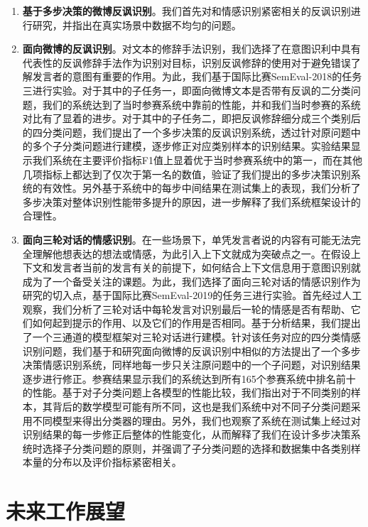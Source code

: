 \begin{enumerate}

\item {\bf 基于多步决策的微博反讽识别}。我们首先对和情感识别紧密相关的反讽识别进行研究，并指出在真实场景中数据不均匀的问题。



\item {\bf 面向微博的反讽识别}。对文本的修辞手法识别，我们选择了在意图识利中具有代表性的反讽修辞手法作为识别对目标，识别反讽修辞的使用对于避免错误了解发言者的意图有重要的作用。为此，我们基于国际比赛SemEval-2018的任务三进行实验。对于其中的子任务一，即面向微博文本是否带有反讽的二分类问题，我们的系统达到了当时参赛系统中靠前的性能，并和我们当时参赛的系统对比有了显着的进步。对于其中的子任务二，即把反讽修辞细分成三个类别后的四分类问题，我们提出了一个多步决策的反讽识别系统，透过针对原问题中的多个子分类问题进行建模，逐步修正对应类别样本的识别结果。实验结果显示我们系统在主要评价指标F1值上显着优于当时参赛系统中的第一，而在其他几项指标上都达到了仅次于第一名的数值，验证了我们提出的多步决策识别系统的有效性。另外基于系统中的每步中间结果在测试集上的表现，我们分析了多步决策对整体识别性能带多提升的原因，进一步解释了我们系统框架设计的合理性。

\item {\bf 面向三轮对话的情感识别}。在一些场景下，单凭发言者说的内容有可能无法完全理解他想表达的想法或情感，为此引入上下文就成为突破点之一。在假设上下文和发言者当前的发言有关的前提下，如何结合上下文信息用于意图识别就成为了一个备受关注的课题。为此，我们选择了面向三轮对话的情感识别作为研究的切入点，基于国际比赛SemEval-2019的任务三进行实验。首先经过人工观察，我们分析了三轮对话中每轮发言对识别最后一轮的情感是否有帮助、它们如何起到提示的作用、以及它们的作用是否相同。基于分析结果，我们提出了一个三通道的模型框架对三轮对话进行建模。针对该任务对应的四分类情感识别问题，我们基于和研究面向微博的反讽识别中相似的方法提出了一个多步决策情感识别系统，同样地每一步只关注原问题中的一个子问题，对识别结果逐步进行修正。参赛结果显示我们的系统达到所有165个参赛系统中排名前十的性能。基于对子分类问题上各模型的性能比较，我们指出对于不同类别的样本，其背后的数学模型可能有所不同，这也是我们系统中对不同子分类问题采用不同模型来得出分类器的理由。另外，我们也观察了系统在测试集上经过对识别结果的每一步修正后整体的性能变化，从而解释了我们在设计多步决策系统时选择子分类问题的原则，并强调了子分类问题的选择和数据集中各类别样本量的分布以及评价指标紧密相关。

\end{enumerate}

\section{未来工作展望}

